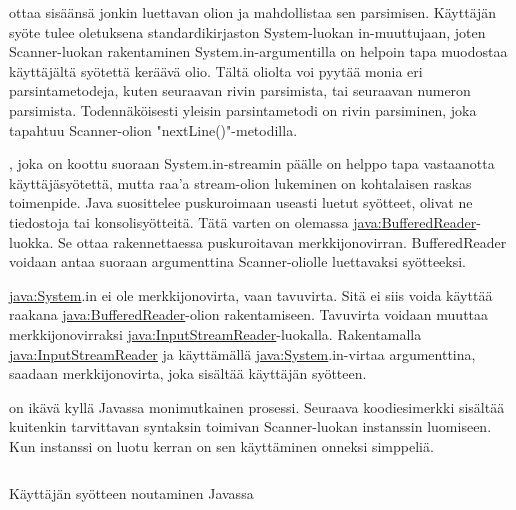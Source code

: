 \documentclass{tufte-book}
\newcommand{\java}[1]{\underline{\gls{java:#1}}}
\newcommand{\code}[3]{
\begin{listing}
    \inputminted{java}{OhjelmointiopasEsimerkit/src/#1/#2.java}
    \caption{#3}
    \label{Java-#1-#2}
\end{listing}
}
\begin{document}
\newthought{\java{Scanner}-luokka} ottaa sisäänsä jonkin luettavan olion ja mahdollistaa sen
parsimisen. Käyttäjän syöte tulee oletuksena standardikirjaston System-luokan in-muuttujaan,
joten Scanner-luokan rakentaminen System.in-argumentilla on helpoin tapa muodostaa käyttäjältä
syötettä keräävä olio. Tältä oliolta voi pyytää monia eri parsintametodeja, kuten seuraavan rivin
parsimista, tai seuraavan numeron parsimista. Todennäköisesti yleisin parsintametodi on rivin
parsiminen, joka tapahtuu Scanner-olion "nextLine()"-metodilla.

\newthought{\java{Scanner}}, joka on koottu suoraan System.in-streamin
päälle on helppo tapa vastaanotta käyttäjäsyötettä, mutta raa'a stream-olion lukeminen on
kohtalaisen raskas toimenpide. Java suosittelee puskuroimaan useasti luetut syötteet, olivat ne
tiedostoja tai konsolisyötteitä. Tätä varten on olemassa \java{BufferedReader}-luokka. Se ottaa
rakennettaessa puskuroitavan merkkijonovirran. BufferedReader voidaan antaa suoraan argumenttina
Scanner-oliolle luettavaksi syötteeksi.

 \java{System}.in ei ole merkkijonovirta, vaan tavuvirta. Sitä ei siis
voida käyttää raakana \java{BufferedReader}-olion rakentamiseen. Tavuvirta voidaan muuttaa
merkkijonovirraksi \java{InputStreamReader}-luokalla. Rakentamalla \java{InputStreamReader}
ja käyttämällä \java{System}.in-virtaa argumenttina, saadaan merkkijonovirta, joka sisältää
käyttäjän syötteen.

 on ikävä kyllä Javassa monimutkainen prosessi. Seuraava
koodiesimerkki sisältää kuitenkin tarvittavan syntaksin toimivan Scanner-luokan instanssin
luomiseen. Kun instanssi on luotu kerran on sen käyttäminen onneksi simppeliä.

\code{week2}{BasicUserInput}{Käyttäjän syötteen noutaminen Javassa}


\clearpage
\printglossary[title=Sanasto, toctitle=Sanasto]
\printglossary[type=java, title=Javan avainsanat, toctitle=Javan avainsanat]

\end{document}
